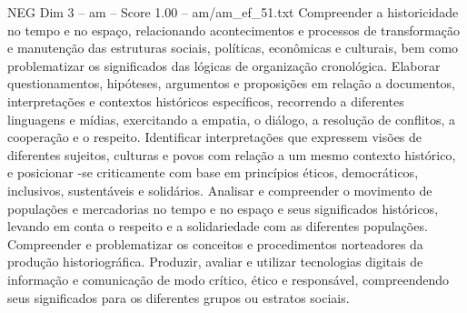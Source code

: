 \begin{textsample}{NEG Dim 3 – am – Score 1.00 – am/am\_ef\_51.txt}  \label{ex:f3_neg_259}
Compreender a historicidade no tempo e no espaço, relacionando acontecimentos e processos de transformação e manutenção das estruturas sociais, políticas, econômicas e culturais, bem como problematizar os significados das lógicas de organização cronológica.
Elaborar questionamentos, hipóteses, argumentos e proposições em relação a documentos, interpretações e contextos históricos específicos, recorrendo a diferentes linguagens e mídias, exercitando a empatia, o diálogo, a resolução de conflitos, a cooperação e o respeito.
Identificar interpretações que expressem visões de diferentes sujeitos, culturas e povos com relação a um mesmo contexto histórico, e posicionar -se criticamente com base em princípios éticos, democráticos, inclusivos, sustentáveis e solidários.
Analisar e compreender o movimento de populações e mercadorias no tempo e no espaço e seus significados históricos, levando em conta o respeito e a solidariedade com as diferentes populações.
Compreender e problematizar os conceitos e procedimentos norteadores da produção historiográfica.
Produzir, avaliar e utilizar tecnologias digitais de informação e comunicação de modo crítico, ético e responsável, compreendendo seus significados para os diferentes grupos ou estratos sociais.

\end{textsample}
